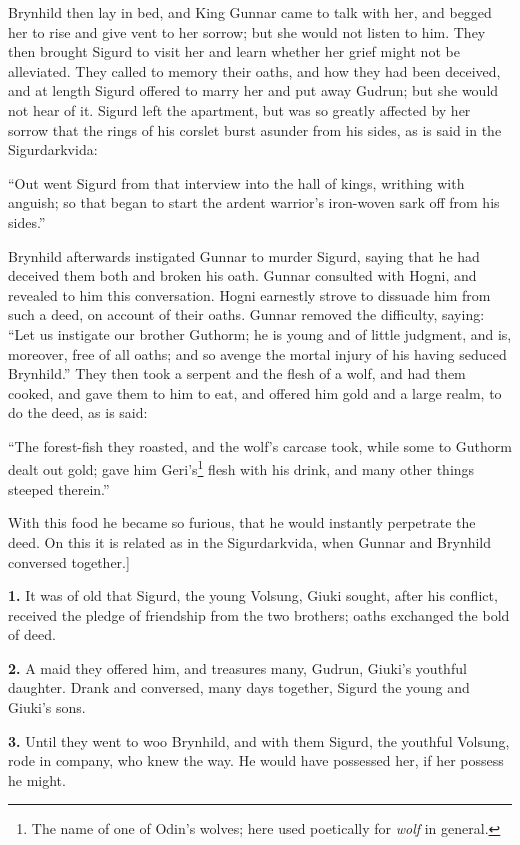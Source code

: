 Brynhild then lay in bed, and King Gunnar came to talk with her, and
begged her to rise and give vent to her sorrow; but she would not
listen to him. They then brought Sigurd to visit her and learn whether
her grief might not be alleviated. They called to memory their oaths,
and how they had been deceived, and at length Sigurd offered to marry
her and put away Gudrun; but she would not hear of it. Sigurd left the
apartment, but was so greatly affected by her sorrow that the rings of
his corslet burst asunder from his sides, as is said in the
Sigurdarkvida:

``Out went Sigurd from that interview into the hall of kings, writhing
with anguish; so that began to start the ardent warrior's iron-woven
sark off from his sides.''

Brynhild afterwards instigated Gunnar to murder Sigurd, saying that he
had deceived them both and broken his oath. Gunnar consulted with
Hogni, and revealed to him this conversation. Hogni earnestly strove
to dissuade him from such a deed, on account of their oaths. Gunnar
removed the difficulty, saying: ``Let us instigate our brother Guthorm;
he is young and of little judgment, and is, moreover, free of all
oaths; and so avenge the mortal injury of his having seduced
Brynhild.'' They then took a serpent and the flesh of a wolf, and had
them cooked, and gave them to him to eat, and offered him gold and a
large realm, to do the deed, as is said:

``The forest-fish they roasted, and the wolf's carcase took, while
some to Guthorm dealt out gold; gave him Geri's\footnote{The name of one of Odin's wolves; here used poetically
for \emph{wolf} in general.} flesh with his
drink, and many other things steeped therein.''

With this food he became so furious, that he would instantly
perpetrate the deed. On this it is related as in the Sigurdarkvida,
when Gunnar and Brynhild conversed together.]


\textbf{1.} It was of old that Sigurd, the young Volsung, Giuki sought, after
his conflict, received the pledge of friendship from the two brothers;
oaths exchanged the bold of deed.

\textbf{2.} A maid they offered him, and treasures many, Gudrun, Giuki's
youthful daughter. Drank and conversed, many days together, Sigurd the
young and Giuki's sons.

\textbf{3.} Until they went to woo Brynhild, and with them Sigurd, the
youthful Volsung, rode in company, who knew the way. He would have
possessed her, if her possess he might.


